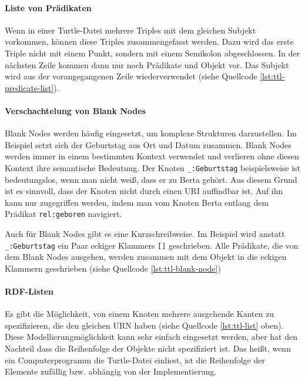 		\paragraph{Liste von Prädikaten}
		Wenn in einer Turtle-Datei mehrere Triples mit dem gleichen Subjekt vorkommen, können diese Triples zusammengefasst werden. Dazu wird das erste Triple nicht mit einem Punkt, sondern mit einem Semikolon abgeschlossen. In der nächsten Zeile kommen dann nur noch Prädikate und Objekt vor. Das Subjekt wird aus der vorangegangenen Zeile wiederverwendet (siehe Quellcode \ref{lst:ttl-predicate-list}).

		\paragraph{Verschachtelung von Blank Nodes}
		Blank Nodes werden häufig eingesetzt, um komplexe Strukturen darzustellen. Im Beispiel setzt sich der Geburtstag aus Ort und Datum zusammen. Blank Nodes werden immer in einem bestimmten Kontext verwendet und verlieren ohne diesen Kontext ihre semantische Bedeutung. Der Knoten \lstinline|_:Geburtstag| beispielsweise ist bedeutungslos, wenn man nicht weiß, dass er zu Berta gehört. Aus diesem Grund ist es sinnvoll, dass der Knoten nicht durch einen URI auffindbar ist. Auf ihn kann nur zugegriffen werden, indem man vom Knoten Berta entlang dem Prädikat \lstinline|rel:geboren| navigiert.
		
		Auch für Blank Nodes gibt es eine Kurzschreibweise. Im Beispiel wird anstatt \lstinline|_:Geburtstag| ein Paar eckiger Klammers \lstinline|[]| geschrieben. Alle Prädikate, die von dem Blank Nodes ausgehen, werden zusammen mit dem Objekt in die eckigen Klammern geschrieben (siehe Quellcode \ref{lst:ttl-blank-node})

		\paragraph{RDF-Listen}
		Es gibt die Möglichkeit, von einem Knoten mehrere ausgehende Kanten zu spezifizieren, die den gleichen URN haben (siehe Quellcode \ref{lst:ttl-list} oben). Diese Modellierungmöglichkeit kann sehr einfach eingesetzt werden, aber hat den Nachteil dass die Reihenfolge der Objekte nicht spezifiziert ist. Das heißt, wenn ein Computerprogramm  die Turtle-Datei einliest, ist die Reihenfolge der Elemente zufällig bzw. abhängig von der Implementierung.
		
